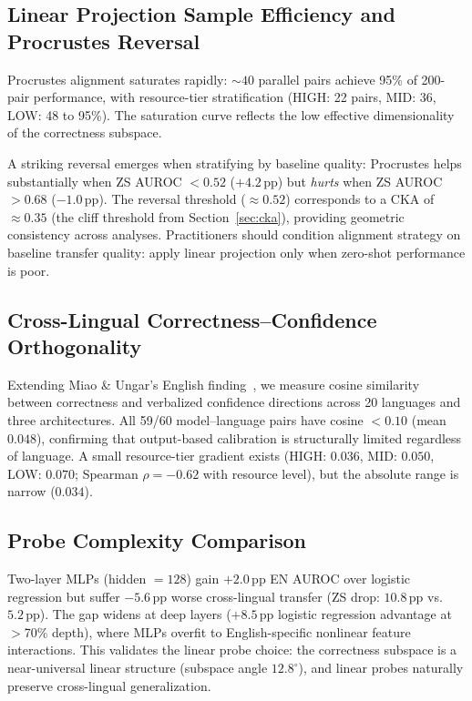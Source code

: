 \documentclass[11pt,a4paper]{article}
\newcommand{\pp}{\,\text{pp}}
\begin{document}
\subsection{Linear Projection Sample Efficiency and Procrustes Reversal}
\label{sec:linproj}

Procrustes alignment saturates rapidly: ${\sim}40$ parallel pairs achieve 95\% of 200-pair performance, with resource-tier stratification (HIGH: 22 pairs, MID: 36, LOW: 48 to 95\%).
The saturation curve reflects the low effective dimensionality of the correctness subspace.

A striking reversal emerges when stratifying by baseline quality: Procrustes helps substantially when ZS AUROC $< 0.52$ ($+4.2\pp$) but \emph{hurts} when ZS AUROC $> 0.68$ ($-1.0\pp$).
The reversal threshold (${\approx}0.52$) corresponds to a CKA of ${\approx}0.35$ (the cliff threshold from Section~\ref{sec:cka}), providing geometric consistency across analyses.
Practitioners should condition alignment strategy on baseline transfer quality: apply linear projection only when zero-shot performance is poor.

\subsection{Cross-Lingual Correctness--Confidence Orthogonality}

Extending Miao \& Ungar's English finding~\cite{miao2026steering}, we measure cosine similarity between correctness and verbalized confidence directions across 20 languages and three architectures.
All 59/60 model--language pairs have cosine $< 0.10$ (mean $0.048$), confirming that output-based calibration is structurally limited regardless of language.
A small resource-tier gradient exists (HIGH: $0.036$, MID: $0.050$, LOW: $0.070$; Spearman $\rho = -0.62$ with resource level), but the absolute range is narrow ($0.034$).

\subsection{Probe Complexity Comparison}

Two-layer MLPs (hidden $= 128$) gain $+2.0\pp$ EN AUROC over logistic regression but suffer $-5.6\pp$ worse cross-lingual transfer (ZS drop: $10.8\pp$ vs.\ $5.2\pp$).
The gap widens at deep layers ($+8.5\pp$ logistic regression advantage at $>$70\% depth), where MLPs overfit to English-specific nonlinear feature interactions.
This validates the linear probe choice: the correctness subspace is a near-universal linear structure (subspace angle $12.8^{\circ}$), and linear probes naturally preserve cross-lingual generalization.
\end{document}
